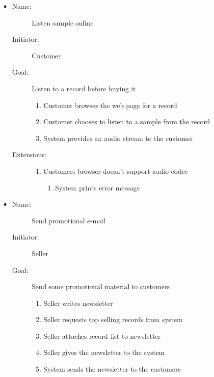 \documentclass[12pt, titlepage]{article}
\begin{document}
\begin{description}
\begin{itemize}
    \item
        \begin{description}
            \item[Name:]Listen sample online 
            \item[Initiator:]Customer
            \item[Goal:]Listen to a record before buying it
            \begin{enumerate}
                \item Customer browses the web page for a record
                \item Customer chooses to listen to a sample from the record
                \item System provides an audio stream to the customer
            \end{enumerate}
    	    \item[Extensions:] \hfil
	    \begin{enumerate}
		\item Customers browser doesn't support audio codec
		\begin{enumerate}
			\item System prints error message
		\end{enumerate}
	    \end{enumerate}
        \end{description}

    \item
        \begin{description}
            \item[Name:]Send promotional e-mail 
            \item[Initiator:]Seller
            \item[Goal:]Send some promotional material to customers 
	    \begin{enumerate}
		\item Seller writes newsletter
		\item Seller requests top selling records from system
		\item Seller attaches record list to newsletter
		\item Seller gives the newsletter to the system
		\item System sends the newsletter to the customers
		\end{enumerate}
        \end{description}


\end{itemize}
\end{description}
\end{document}
